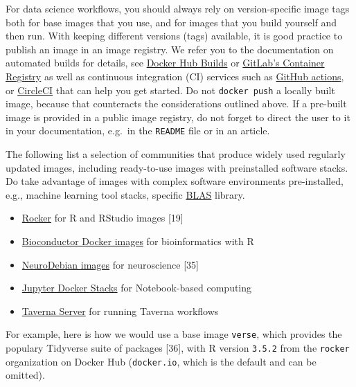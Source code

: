 \documentclass[10pt,letterpaper]{article}
\providecommand{\tightlist}{%
  \setlength{\itemsep}{0pt}\setlength{\parskip}{0pt}}
\begin{document}
For data science workflows, you should always rely on version-specific
image tags both for base images that you use, and for images that you
build yourself and then run. With keeping different versions (tags)
available, it is good practice to publish an image in an image registry.
We refer you to the documentation on automated builds for details, see
\href{https://docs.docker.com/docker-hub/builds/}{Docker Hub Builds} or
\href{https://docs.gitlab.com/ee/user/packages/container_registry/index.html\#build-and-push-images}{GitLab's
Container Registry} as well as continuous integration (CI) services such
as
\href{https://github.com/actions/starter-workflows/tree/master/ci}{GitHub
actions}, or
\href{https://circleci.com/orbs/registry/orb/circleci/docker\#commands-build}{CircleCI}
that can help you get started. Do not \texttt{docker\ push} a locally
built image, because that counteracts the considerations outlined above.
If a pre-built image is provided in a public image registry, do not
forget to direct the user to it in your documentation, e.g.~in the
\texttt{README} file or in an article.

The following list a selection of communities that produce widely used
regularly updated images, including ready-to-use images with
preinstalled software stacks. Do take advantage of images with complex
software environments pre-installed, e.g., machine learning tool stacks,
specific
\href{https://en.wikipedia.org/wiki/Basic_Linear_Algebra_Subprograms}{BLAS}
library.

\begin{itemize}
\tightlist
\item
  \href{https://www.rocker-project.org/}{Rocker} for R and RStudio
  images {[}19{]}
\item
  \href{https://bioconductor.org/help/docker/}{Bioconductor Docker
  images} for bioinformatics with R
\item
  \href{https://hub.docker.com/_/neurodebian}{NeuroDebian images} for
  neuroscience {[}35{]}
\item
  \href{https://jupyter-docker-stacks.readthedocs.io/en/latest/index.html}{Jupyter
  Docker Stacks} for Notebook-based computing
\item
  \href{https://hub.docker.com/r/taverna/taverna-server}{Taverna Server}
  for running Taverna workflows
\end{itemize}

For example, here is how we would use a base image \texttt{verse}, which
provides the populary Tidyverse suite of packages {[}36{]}, with R
version \texttt{3.5.2} from the \texttt{rocker} organization on Docker
Hub (\texttt{docker.io}, which is the default and can be omitted).
\end{document}
